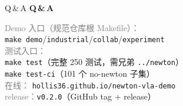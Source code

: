 \documentclass[aspectratio=169, 11pt]{beamer}
\begin{document}
\begin{frame}{Q\,\&\,A}
\vspace{30pt}
\centering
\Large \textbf{Q\,\&\,A}
\vspace{18pt}

\normalsize
\textcolor{gray}{Demo 入口（规范仓库根 Makefile）：}\\[6pt]
\texttt{make demo}\;/\;\texttt{industrial}\;/\;\texttt{collab}\;/\;\texttt{experiment}\\[12pt]

\textcolor{gray}{测试入口：}\\[6pt]
\texttt{make test}\quad（完整 250 测试，需兄弟 \texttt{../newton}）\\
\texttt{make test-ci}\quad（101 个 no-newton 子集）\\[12pt]

\textcolor{gray}{在线：}\;
\texttt{hollis36.github.io/newton-vla-demo}\\[12pt]

\textcolor{gray}{release：}\quad \texttt{v0.2.0}\quad（GitHub tag + release）
\end{frame}
\end{document}
